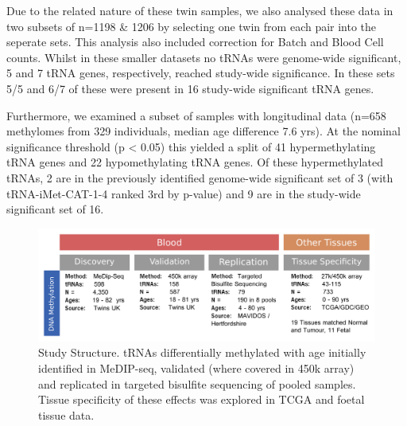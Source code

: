 \documentclass[
]{book}
\begin{document}
Due to the related nature of these twin samples, we also analysed these data in two subsets of n=1198 \& 1206 by selecting one twin from each pair into the seperate sets.
This analysis also included correction for Batch and Blood Cell counts.
Whilst in these smaller datasets no tRNAs were genome-wide significant, 5 and 7 tRNA genes, respectively, reached study-wide significance.
In these sets 5/5 and 6/7 of these were present in 16 study-wide significant tRNA genes.

Furthermore, we examined a subset of samples with longitudinal data (n=658 methylomes from 329 individuals, median age difference 7.6 yrs).
At the nominal significance threshold (p \textless{} 0.05) this yielded a split of 41 hypermethylating tRNA genes and 22 hypomethylating tRNA genes.
Of these hypermethylated tRNAs, 2 are in the previously identified genome-wide significant set of 3 (with tRNA-iMet-CAT-1-4 ranked 3rd by p-value) and 9 are in the study-wide significant set of 16.

\begin{figure}

{\centering \includegraphics[width=1\linewidth]{figs/OverviewOfAnalysesFigure_tRNA_3} 

}

\caption{Study Structure. tRNAs differentially methylated with age initially identified in MeDIP-seq, validated (where covered in 450k array) and replicated in targeted bisulfite sequencing of pooled samples. Tissue specificity of these effects was explored in TCGA and foetal tissue data.}\label{fig:OverviewOfAnalyses}
\end{figure}
\end{document}
